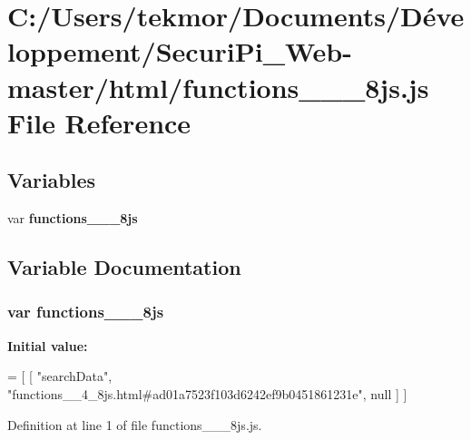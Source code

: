 \section{C\+:/\+Users/tekmor/\+Documents/\+Développement/\+Securi\+Pi\+\_\+\+Web-\/master/html/functions\+\_\+\+\_\+\_\+8js.js File Reference}
\label{functions____4__8js_8js}
\subsection*{Variables}
\begin{DoxyCompactItemize}
\item 
var {\bf functions\+\_\+\+\_\+\_\+8js}
\end{DoxyCompactItemize}


\subsection{Variable Documentation}
\subsubsection[{functions\+\_\+\+\_\+4\+\_\+8js}]{\setlength{\rightskip}{0pt plus 5cm}var functions\+\_\+\+\_\+\_\+8js}\label{functions____4__8js_8js_afdaf754972e311849ad19f5c0b447d32}
{\bfseries Initial value\+:}
\begin{DoxyCode}
=
[
    [ \textcolor{stringliteral}{"searchData"}, \textcolor{stringliteral}{"functions\_\_4\_8js.html#ad01a7523f103d6242ef9b0451861231e"}, null ]
]
\end{DoxyCode}


Definition at line 1 of file functions\+\_\+\+\_\+\_\+8js.\+js.

